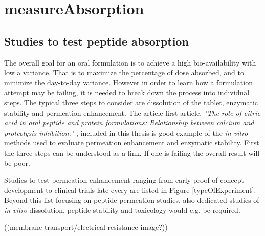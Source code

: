 \chapter{measureAbsorption}


\section{Studies to test peptide absorption}
The overall goal for an oral formulation is to achieve a high bio-availability with low a variance. That is to maximize the percentage of dose absorbed, and to minimize the day-to-day variance. However in order to learn how a formulation attempt may be failing, it is needed to break down the process into individual steps. The typical three steps to consider are dissolution of the tablet, enzymatic stability and permeation enhancement. The article first article, \textit{"The role of citric acid in oral peptide and protein formulations: Relationship between calcium and proteolysis inhibition."} \cite{welling2014citric}, included in this thesis is good example of the \textit{in vitro} methods used to evaluate permeation enhancement and enzymatic stability. First the three steps can be understood as a link. If one is failing the overall result will be poor.

Studies to test permeation enhancement ranging from early proof-of-concept development to clinical trials late every are listed in Figure \ref{typeOfExperiment}. Beyond this list focusing on peptide permeation studies, also dedicated studies of \textit{in vitro} dissolution, peptide stability and toxicology would e.g. be required.

((membrane transport/electrical resistance image?))

